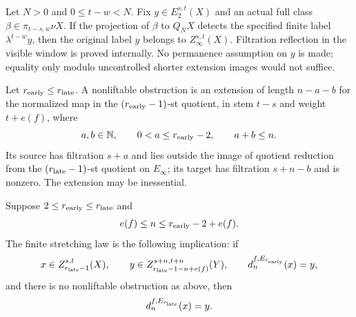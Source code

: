 \begin{theorem}
\label{sem:ProofTools:mh-lifted-target-permanent}
Let $N>0$ and $0\leq t-w<N$. Fix $y\in E_2^{s,t}(X)$ and an actual full class $\beta\in\pi_{t-s,w}\nu X$. If the projection of $\beta$ to $Q_NX$ detects the specified finite label $\lambda^{t-w}y$, then the original label $y$ belongs to $Z_\infty^{s,t}(X)$. Filtration reflection in the visible window is proved internally. No permanence assumption on $y$ is made; equality only modulo uncontrolled shorter extension images would not suffice.
\end{theorem}

\begin{definition}
\label{sem:ProofTools:nonliftable-obstruction}
Let $r_{\rm early}\leq r_{\rm late}$. A nonliftable obstruction is an extension of length $n-a-b$ for the normalized map in the $(r_{\rm early}-1)$-st quotient, in stem $t-s$ and weight $t+e(f)$, where
\[a,b\in\mathbb N,\qquad 0<a\leq r_{\rm early}-2,\qquad a+b\leq n.\]
Its source has filtration $s+a$ and lies outside the image of quotient reduction from the $(r_{\rm late}-1)$-st quotient on $E_\infty$; its target has filtration $s+n-b$ and is nonzero. The extension may be inessential.
\end{definition}

\begin{definition}
\label{sem:ProofTools:finite-stretching-law}
Suppose $2\leq r_{\rm early}\leq r_{\rm late}$ and
\[e(f)\leq n\leq r_{\rm early}-2+e(f).\]
The finite stretching law is the following implication: if
\[x\in Z_{r_{\rm late}-1}^{s,t}(X),\qquad y\in Z_{r_{\rm late}-1-n+e(f)}^{s+n,t+n}(Y),\qquad d_n^{f,E_{r_{\rm early}}}(x)=y,\]
and there is no nonliftable obstruction as above, then
\[d_n^{f,E_{r_{\rm late}}}(x)=y.\]
\end{definition}


